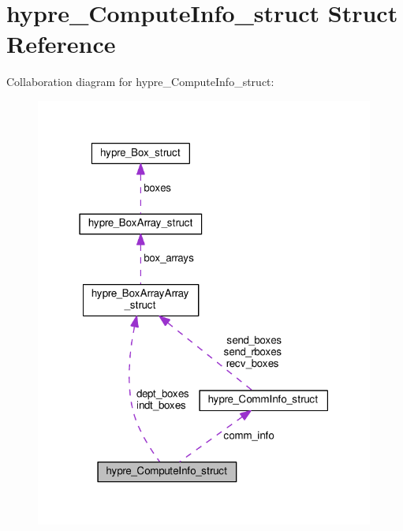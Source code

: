 \hypertarget{structhypre__ComputeInfo__struct}{}\section{hypre\+\_\+\+Compute\+Info\+\_\+struct Struct Reference}
\label{structhypre__ComputeInfo__struct}


Collaboration diagram for hypre\+\_\+\+Compute\+Info\+\_\+struct\+:
\nopagebreak
\begin{figure}[H]
\begin{center}
\leavevmode
\includegraphics[width=316pt]{structhypre__ComputeInfo__struct__coll__graph}
\end{center}
\end{figure}
